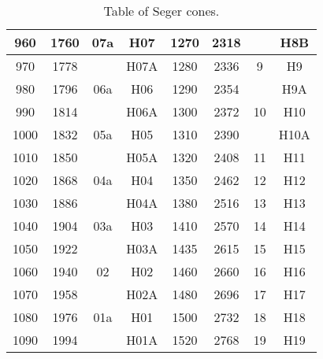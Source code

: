 \begin{center}
\begin{table}
\begin{tabular}{|c|c|c|c||c|c|c|c|}
      960&1760&07a&H07&1270&2318&&H8B\\\hline
      970&1778&&H07A&1280&2336&9&H9\\\hline
      980&1796&06a&H06&1290&2354&&H9A\\\hline
      990&1814&&H06A&1300&2372&10&H10\\\hline
      1000&1832&05a&H05&1310&2390&&H10A\\\hline
      1010&1850&&H05A&1320&2408&11&H11\\\hline
      1020&1868&04a&H04&1350&2462&12&H12\\\hline
      1030&1886&&H04A&1380&2516&13&H13\\\hline
      1040&1904&03a&H03&1410&2570&14&H14\\\hline
      1050&1922&&H03A&1435&2615&15&H15\\\hline
      1060&1940&02&H02&1460&2660&16&H16\\\hline
      1070&1958&&H02A&1480&2696&17&H17\\\hline
      1080&1976&01a&H01&1500&2732&18&H18\\\hline
      1090&1994&&H01A&1520&2768&19&H19\\\hline
    \end{tabular}
    \caption{Table of Seger cones.}
    \label{tab:ortoncone}
  \end{table}
\end{center}
